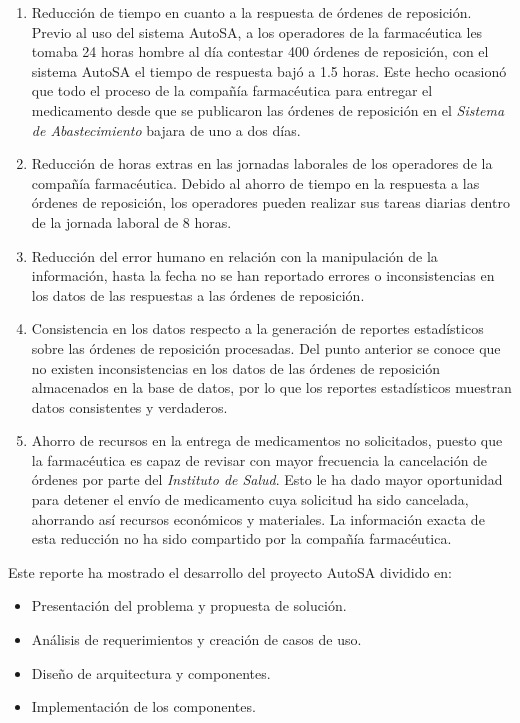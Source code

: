 \begin{enumerate}
	\item Reducción de tiempo en cuanto a la respuesta de órdenes de reposición. Previo al uso del sistema AutoSA, a los operadores de la farmacéutica les tomaba 24 horas hombre al día contestar 400 órdenes de reposición, con el sistema AutoSA el tiempo de respuesta bajó a 1.5 horas. Este hecho ocasionó que todo el proceso de la compañía farmacéutica para entregar el medicamento desde que se publicaron las órdenes de reposición en el \textit{Sistema de Abastecimiento} bajara de uno a dos días.
	\item Reducción de horas extras en las jornadas laborales de los operadores de la compañía farmacéutica. Debido al ahorro de tiempo en la respuesta a las órdenes de reposición, los operadores pueden realizar sus tareas diarias dentro de la jornada laboral de 8 horas.
	\item Reducción del error humano en relación con la manipulación de la información, hasta la fecha no se han reportado errores o inconsistencias en los datos de las respuestas a las órdenes de reposición.
	\item Consistencia en los datos respecto a la generación de reportes estadísticos sobre las órdenes de reposición procesadas. Del punto anterior se conoce que no existen inconsistencias en los datos de las órdenes de reposición almacenados en la base de datos, por lo que los reportes estadísticos muestran datos consistentes y verdaderos.
	\item Ahorro de recursos en la entrega de medicamentos no solicitados, puesto que la farmacéutica es capaz de revisar con mayor frecuencia la cancelación de órdenes por parte del \textit{Instituto de Salud}. Esto le ha dado mayor oportunidad para detener el envío de medicamento cuya solicitud ha sido cancelada, ahorrando así recursos económicos y materiales. La información exacta de esta reducción no ha sido compartido por la compañía farmacéutica.
\end{enumerate}
Este reporte ha mostrado el desarrollo del proyecto AutoSA dividido en:
\begin{itemize}
	\item Presentación del problema y propuesta de solución. 
	\item Análisis de requerimientos y creación de casos de uso.
	\item Diseño de arquitectura y componentes.
	\item Implementación de los componentes.
\end{itemize}

